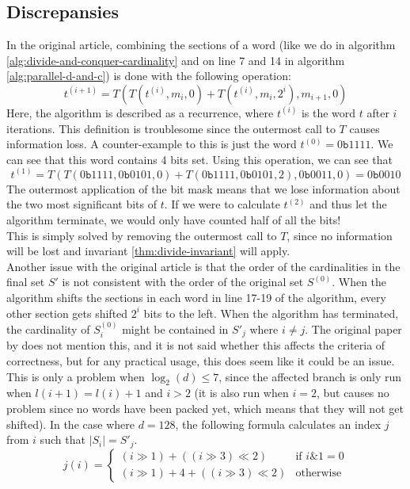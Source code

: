 \subsection{Discrepansies}
In the original article, combining the sections of a word (like we do in algorithm \ref{alg:divide-and-conquer-cardinality} and on line 7 and 14 in algorithm \ref{alg:parallel-d-and-c}) is done with the following operation:
$$t^{(i+1)}=T(T(t^{(i)}, m_i, 0) + T(t^{(i)}, m_i, 2^i), m_{i+1}, 0)$$
Here, the algorithm is described as a recurrence, where $t^{(i)}$ is the word $t$ after $i$ iterations. This definition is troublesome since the outermost call to $T$ causes information loss. A counter-example to this is just the word $t^{(0)} = 0\texttt{b}1111$. We can see that this word contains 4 bits set. Using this operation, we can see that 
$$t^{(1)}=T(T(0\texttt{b}1111, 0\texttt{b}0101, 0) + T(0\texttt{b}1111, 0\texttt{b}0101, 2), 0\texttt{b}0011, 0) = 0\texttt{b}0010$$
The outermost application of the bit mask means that we lose information about the two most significant bits of $t$. If we were to calculate $t^{(2)}$ and thus let the algorithm terminate, we would only have counted half of all the bits!\\
This is simply solved by removing the outermost call to $T$, since no information will be lost and invariant \ref{thm:divide-invariant} will apply.\\
Another issue with the original article is that the order of the cardinalities in the final set $S'$ is not consistent with the order of the original set $S^{(0)}$.
When the algorithm shifts the sections in each word in line 17-19 of the algorithm, every other section gets shifted $2^i$ bits to the left. 
When the algorithm has terminated, the cardinality of $S^{(0)}_i$ might be contained in $S'_j$ where $i\not = j$. The original paper by \citet{fast-similarity-search} does not mention this, and it is not said whether this affects the criteria of correctness, but for any practical usage, this does seem like it could be an issue. 
This is only a problem when $\log_2(d) \leq 7$, since the affected branch is only run when $l(i + 1) = l(i) + 1$ and $i > 2$ (it is also run when $i=2$, but causes no problem since no words have been packed yet, which means that they will not get shifted). In the case where $d=128$, the following formula calculates an index $j$ from $i$ such that $|S_i|=S'_j$.\\
$$
j(i) =
\begin{cases}
    (i \gg 1) + ((i \gg 3) \ll 2) & \textrm{if }i \& 1 = 0 \\
    (i \gg 1) + 4 + ((i \gg 3) \ll 2) & \textrm{otherwise}
\end{cases}
$$
